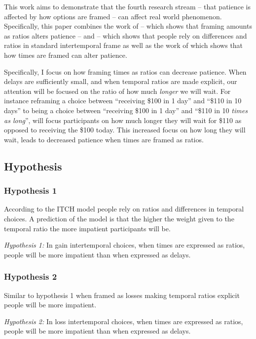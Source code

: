 \documentclass[]{article}
\begin{document}
 
This work aims to demonstrate that the fourth research stream -- that patience is affected by how options are framed -- can affect real world phenomenon.
Specifically, this paper combines the work of  -- which shows that framing amounts as ratios alters patience -- and  -- which shows that people rely on differences and ratios in standard intertemporal frame as well as the work  of   which shows that how times are framed can alter patience. 

Specifically, I focus on how framing times as ratios can decrease patience.
When delays are sufficiently small, and when temporal ratios are made explicit, our attention will be focused on the ratio of how much \textit{longer} we will wait. 
For instance reframing a choice between ``receiving \$100  in 1 day'' and ``\$110 in 10 days'' to being a choice between ``receiving \$100  in 1 day'' and ``\$110 in 10 \textit{times as long}'', will focus participants on how much longer they will wait for \$110 as opposed to receiving the \$100 today.
This increased focus on how long they will wait, leads to decreased patience when times are framed as ratios.

\subsection{Hypothesis}

\subsubsection{Hypothesis 1}
According to the ITCH model people rely on ratios and differences in temporal choices. 
A prediction of the model is that the higher the weight given to the temporal ratio the more impatient participants will be.

\textit{Hypothesis 1:} In gain intertemporal choices, when times are expressed as ratios, people will be more impatient than when expressed as delays. 

\subsubsection{Hypothesis 2}
Similar to hypothesis 1 when framed as losses making temporal ratios explicit people will be more impatient. 

\textit{Hypothesis 2:} In loss intertemporal choices, when times are expressed as ratios, people will be more impatient than when expressed as delays. 
\end{document}
